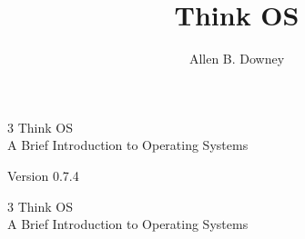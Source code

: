 \documentclass[12pt]{book}
\title{Think OS}
\author{Allen B. Downey}
\newcommand{\thetitle}{Think OS}
\newcommand{\thesubtitle}{A Brief Introduction to Operating Systems}
\newcommand{\theversion}{0.7.4}
\begin{document}
\frontmatter



  {\topsep}%
  {\topsep}%
  {}%
  {}%
  {\bfseries}%
  {}%
  { }%
  {}%

\theoremstyle{exercise}
\newtheorem{exercise}{Exercise}[chapter]



\begin{latexonly}

\renewcommand{\topfraction}{0.9}
\renewcommand{\blankpage}{\thispagestyle{empty} \quad \newpage}


\thispagestyle{empty}

\begin{flushright}
\vspace*{2.0in}

\begin{spacing}{3}
{\huge \thetitle}\\
{\Large \thesubtitle}
\end{spacing}

\vspace{0.25in}

Version \theversion

\vfill

\end{flushright}


\blankpage
\blankpage

\pagebreak
\thispagestyle{empty}

\begin{flushright}
\vspace*{2.0in}

\begin{spacing}{3}
{\huge \thetitle}\\
{\Large \thesubtitle}
\end{spacing}

\vspace{0.25in}


\end{flushright}
\end{latexonly}
\end{document}
